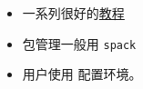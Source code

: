 
\begin{issues}
\issueDraft
\end{issues}

\begin{itemize}
\item 一系列很好的\href{https://hpc-tutorials.llnl.gov/}{教程}
\item 包管理一般用 \verb`spack`
\item 用户使用  配置环境。
\end{itemize}
